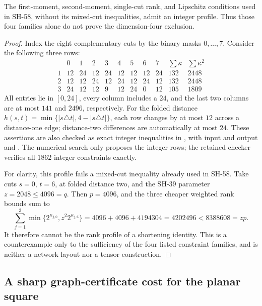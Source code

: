 \begin{proposition}
\label{rt:three-term-moment-probe}
The first-moment, second-moment, single-cut rank, and Lipschitz
conditions used in SH-58, without its mixed-cut inequalities,
admit an integer profile. Thus those four families alone do not
prove the dimension-four exclusion.
\end{proposition}
\begin{proof}
Index the eight complementary cuts by the binary masks $0,\ldots,7$.
Consider the following three rows:
\[
\begin{array}{c|rrrrrrrr|r|r}
 &0&1&2&3&4&5&6&7&\sum\kappa&\sum\kappa^2\\\hline
 1&12&24&12&24&12&12&12&24&132&2448\\
 2&12&12&24&12&24&12&24&12&132&2448\\
 3&24&12&12&9&12&24&0&12&105&1809
\end{array}
\]
All entries lie in $[0,24]$, every column includes a $24$, and
the last two columns are at most $141$ and $2496$, respectively.
For the folded distance
$h(s,t)=\min\{|s\triangle t|,4-|s\triangle t|\}$,
each row changes by at most $12$ across a distance-one edge;
distance-two differences are automatically at most $24$.
These assertions are also checked as exact integer inequalities
in , with
input and output 
and .
The numerical search only proposes the integer rows; the retained
checker verifies all $1862$ integer constraints exactly.

For clarity, this profile fails a mixed-cut inequality already
used in SH-58. Take cuts $s=0$, $t=6$, at folded distance two,
and the SH-39 parameter $z=2048\leq4096=q$.
Then $p=4096$, and the three cheaper weighted rank bounds sum to
\[
 \sum_{j=1}^3\min\{2^{\kappa_{j,0}},z^2 2^{\kappa_{j,6}}\}
 =4096+4096+4194304=4202496
 <8388608=zp.
\]
It therefore cannot be the rank profile of a shortening identity.
This is a counterexample only to the sufficiency of the four
listed constraint families, and is neither a network layout nor
a tensor construction.
\end{proof}

\subsection{A sharp graph-certificate cost for the planar square}

